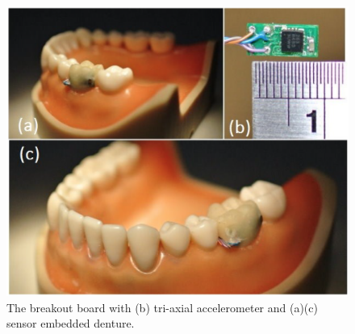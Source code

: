 


\begin{figure}[!ht]
\centering
\includegraphics[width=14cm]{image/teeth.png}
\caption{The breakout board with (b) tri-axial accelerometer and (a)(c) sensor embedded denture.}
\label{teeth_overview}
\end{figure}



